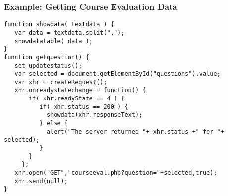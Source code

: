 \documentclass[svgnames]{beamer}
\begin{document}
\begin{frame}[fragile] 
\frametitle{Example: Getting Course Evaluation Data}

\footnotesize
\begin{verbatim}
function showdata( textdata ) {
   var data = textdata.split(",");
   showdatatable( data );
}
function getquestion() {
   set_updatestatus();
   var selected = document.getElementById("questions").value;
   var xhr = createRequest();
   xhr.onreadystatechange = function() {
       if( xhr.readyState == 4 ) {
          if( xhr.status == 200 ) {
            showdata(xhr.responseText);
          } else {
            alert("The server returned "+ xhr.status +" for "+ selected);
          }
       }
     };
   xhr.open("GET","courseeval.php?question="+selected,true);
   xhr.send(null);
}
\end{verbatim}
  
\end{frame}
\end{document}
